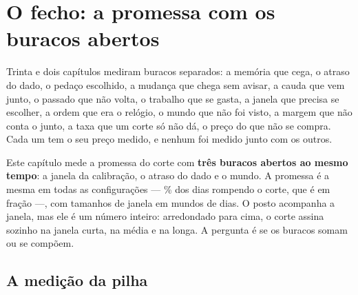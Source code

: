 \chapter{O fecho: a promessa com os buracos abertos}\label{cap:fecho}

Trinta e dois capítulos mediram buracos separados: a memória que cega, o atraso do dado, o pedaço
escolhido, a mudança que chega sem avisar, a cauda que vem junto, o passado que não volta, o trabalho
que se gasta, a janela que precisa se escolher, a ordem que era o relógio, o mundo que não foi visto,
a margem que não conta o junto, a taxa que um corte só não dá, o preço do que não se compra. Cada um
tem o seu preço medido, e nenhum foi medido junto com os outros.

Este capítulo mede a promessa do corte com \textbf{três buracos abertos ao mesmo tempo}: a
janela da calibração, o atraso do dado e o mundo. A promessa é a mesma em todas as
\numFechoConfiguracoes{} configurações --- \numPromessaPct{}\% dos dias rompendo o corte, que é
\numFechoPromessa{} em fração ---, com \numFechoJanelas{} tamanhos de
janela em mundos de \numFechoDias{} dias. O posto acompanha a janela, mas ele é um número inteiro:
arredondado para cima, o corte assina sozinho \numFechoAssinadoCurta{} na janela curta,
\numFechoAssinadoMedia{} na média e \numFechoAssinadoLonga{} na longa. A pergunta é se os buracos somam ou se compõem.

\section{A medição da pilha}

